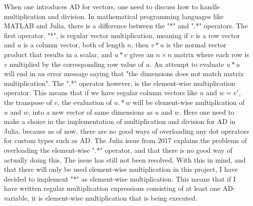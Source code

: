 When one introduces AD for vectors, one need to discuss how to handle multiplication and division. In mathematical programming languages like MATLAB and Julia, there is a difference between the "*" and ".*" operators. The first operator, "*", is regular vector multiplication, meaning if $v$ is a row vector and $u$ is a column vector, both of length $n$, then $v*u$ is the normal vector product that results in a scalar, and $u*v$ gives an $n\times n$ matrix where each row is $v$ multiplied by the corresponding row value of $u$. An attempt to evaluate $u*u$ will end in an error message saying that "the dimensions does not match matrix multiplication". The ".*" operator however, is the element-wise multiplication operator. This means that if we have regular column vectors like $u$ and $w = v'$, the transpose of $v$, the evaluation of $u.*w$ will be element-wise multiplication of $u$ and $w$, into a new vector of same dimensions as $u$ and $w$. Here one need to make a choice in the implementation of multiplication and division for AD in Julia, because as of now, there are no good ways of overloading any dot operators for custom types such as AD. The Julia issue \emph{\cite{JuliaIssueDot}} from 2017 explains the problems of overloading the element-wise ".*" operator, and that there is no good way of actually doing this. The issue has still not been resolved. With this in mind, and that there will only be used element-wise multiplication in this project, I have decided to implement "*" as element-wise multiplication. This means that if I have written regular multiplication expressions consisting of at least one AD-variable, it is element-wise multiplication that is being executed.

